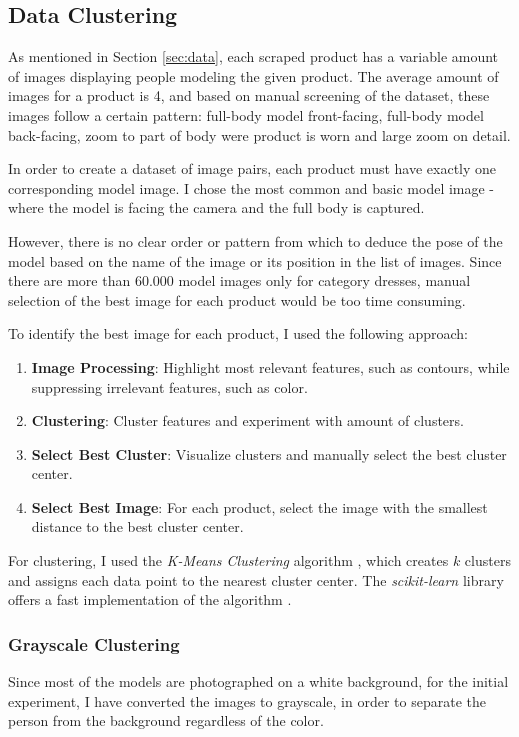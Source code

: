 \documentclass[12pt]{report}
\begin{document}
\pagebreak
\subsection{Data Clustering}
As mentioned in Section \ref{sec:data}, each scraped product has a variable amount of images displaying people modeling the given product. The average amount of images for a product is 4, and based on manual screening of the dataset, these images follow a certain pattern: full-body model front-facing, full-body model back-facing, zoom to part of body were product is worn and large zoom on detail.

In order to create a dataset of image pairs, each product must have exactly one corresponding model image. I chose the most common and basic model image - where the model is facing the camera and the full body is captured. 

However, there is no clear order or pattern from which to deduce the pose of the model based on the name of the image or its position in the list of images. Since there are more than 60.000 model images only for category dresses, manual selection of the best image for each product would be too time consuming.

To identify the best image for each product, I used the following approach:
\begin{enumerate}
	\item \textbf{Image Processing}: Highlight most relevant features, such as contours, while suppressing irrelevant features, such as color.
	\item \textbf{Clustering}: Cluster features and experiment with amount of clusters.
	\item \textbf{Select Best Cluster}: Visualize clusters and manually select the best cluster center.
	\item \textbf{Select Best Image}: For each product, select the image with the smallest distance to the best cluster center.
\end{enumerate}


For clustering, I used the \textit{K-Means Clustering} algorithm \cite{noauthor_k-means_2018}, which creates $k$ clusters and assigns each data point to the nearest cluster center. The \textit{scikit-learn} library offers a fast implementation of the algorithm \cite{noauthor_sklearn.cluster.kmeans_nodate}.

\subsubsection{Grayscale Clustering}
Since most of the models are photographed on a white background, for the initial experiment, I have converted the images to grayscale, in order to separate the person from the background regardless of the color.
\end{document}
